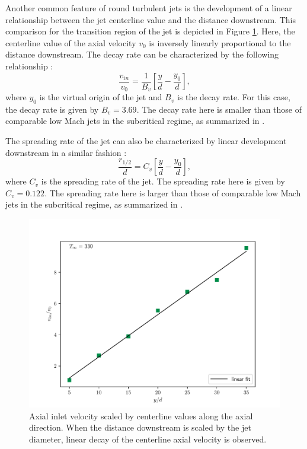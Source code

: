 Another common feature of round turbulent jets is the development of a linear relationship between the jet centerline value and the distance downstream. This comparison for the transition region of the jet is depicted in Figure \ref{330_centerline_scaling}. Here, the centerline value of the axial velocity $v_0$ is inversely linearly proportional to the distance downstream. The decay rate can be characterized by the following relationship \cite{iso_comp_1}:
\begin{equation} \label{decay_rate}
\dfrac{v_{in}}{v_0} = \dfrac{1}{B_v}\left[ \dfrac{y}{d} - \dfrac{y_0}{d} \right],
\end{equation}
where $y_0$ is the virtual origin of the jet \cite{Pope} and $B_v$ is the decay rate. For this case, the decay rate is given by $B_v = 3.69$.  The decay rate here is smaller than those of comparable low Mach jets in the subcritical regime, as summarized in \cite{iso_comp_1_ref_1}. 

The spreading rate of the jet can also be characterized by linear development downstream in a similar fashion \cite{iso_comp_1_ref_1}:
\begin{equation} \label{spread_rate}
\dfrac{r_{1/2}}{d} = C_v\left[ \dfrac{y}{d} - \dfrac{y_0}{d} \right],
\end{equation}
where $C_v$ is the spreading rate of the jet. The spreading rate here is given by $C_v=0.122$. The spreading rate here is larger than those of comparable low Mach jets in the subcritical regime, as summarized in \cite{iso_comp_1_ref_1}. 

\begin{figure}[H]
\begin{center}
	\includegraphics[scale=.7]{figures/Plots/radial/slices_5/same_ambient/uin_u0_vs_x_d.pdf}
	\caption{Axial inlet velocity scaled by centerline values along the axial direction. When the distance downstream is scaled by the jet diameter, linear decay of the centerline axial velocity is observed.} \label{330_centerline_scaling}
\end{center}
\end{figure}

